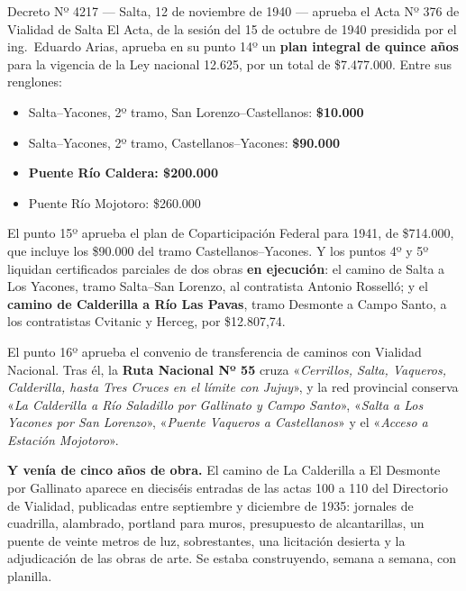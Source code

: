 \begin{ficha}{Decreto Nº 4217 --- Salta, 12 de noviembre de 1940 --- aprueba el Acta Nº 376 de Vialidad de Salta}
El Acta, de la sesión del 15 de octubre de 1940 presidida por el ing.\ Eduardo Arias, aprueba
en su punto 14º un \textbf{plan integral de quince años} para la vigencia de la Ley nacional
12.625, por un total de \$7.477.000. Entre sus renglones:

\begin{itemize}[leftmargin=*,itemsep=1pt]
\item Salta--Yacones, 2º tramo, San Lorenzo--Castellanos: \textbf{\$10.000}
\item Salta--Yacones, 2º tramo, Castellanos--Yacones: \textbf{\$90.000}
\item \textbf{Puente Río Caldera: \$200.000}
\item Puente Río Mojotoro: \$260.000
\end{itemize}

El punto 15º aprueba el plan de Coparticipación Federal para 1941, de \$714.000, que incluye
los \$90.000 del tramo Castellanos--Yacones. Y los puntos 4º y 5º liquidan certificados
parciales de dos obras \textbf{en ejecución}: el camino de Salta a Los Yacones, tramo Salta--San
Lorenzo, al contratista Antonio Rosselló; y el \textbf{camino de Calderilla a Río Las Pavas},
tramo Desmonte a Campo Santo, a los contratistas Cvitanic y Herceg, por \$12.807,74.

El punto 16º aprueba el convenio de transferencia de caminos con Vialidad Nacional. Tras él,
la \textbf{Ruta Nacional Nº 55} cruza «\textit{Cerrillos, Salta, Vaqueros, Calderilla, hasta
Tres Cruces en el límite con Jujuy}», y la red provincial conserva «\textit{La Calderilla a Río
Saladillo por Gallinato y Campo Santo}», «\textit{Salta a Los Yacones por San Lorenzo}»,
«\textit{Puente Vaqueros a Castellanos}» y el «\textit{Acceso a Estación Mojotoro}».
\end{ficha}

\textbf{Y venía de cinco años de obra.} El camino de La Calderilla a El Desmonte por Gallinato
aparece en dieciséis entradas de las actas 100 a 110 del Directorio de Vialidad, publicadas
entre septiembre y diciembre de 1935: jornales de cuadrilla, alambrado, portland para muros, presupuesto de alcantarillas, un
puente de veinte metros de luz, sobrestantes, una licitación desierta y la adjudicación de las
obras de arte. Se estaba construyendo, semana a semana, con planilla.

